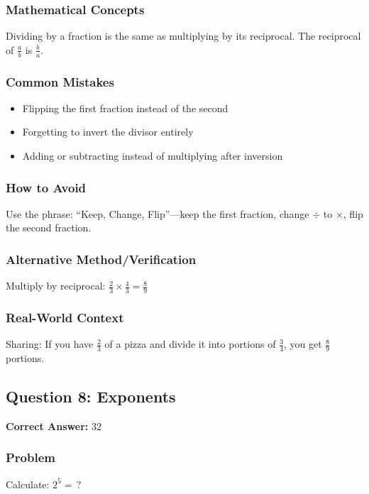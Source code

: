 \documentclass[12pt,a4paper]{article}
\begin{document}
\subsubsection*{Mathematical Concepts}
Dividing by a fraction is the same as multiplying by its reciprocal. The reciprocal of $\frac{a}{b}$ is $\frac{b}{a}$.

\subsubsection*{Common Mistakes}
\begin{itemize}
    \item Flipping the first fraction instead of the second
    \item Forgetting to invert the divisor entirely
    \item Adding or subtracting instead of multiplying after inversion
\end{itemize}

\subsubsection*{How to Avoid}
Use the phrase: ``Keep, Change, Flip''---keep the first fraction, change $\div$ to $\times$, flip the second fraction.

\subsubsection*{Alternative Method/Verification}
Multiply by reciprocal: $\frac{2}{3} \times \frac{4}{3} = \frac{8}{9}$ 

\subsubsection*{Real-World Context}
Sharing: If you have $\frac{2}{3}$ of a pizza and divide it into portions of $\frac{3}{4}$, you get $\frac{8}{9}$ portions.

\vspace{0.5cm}

\subsection*{Question 8: Exponents}

\textbf{Correct Answer:} $32$

\subsubsection*{Problem}
Calculate: $2^5 = \,?$
\end{document}
